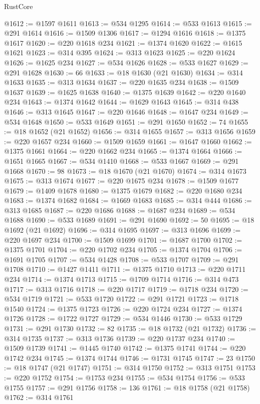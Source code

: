 \begin{lexlean}{RustCore}
\begin{coremodule}
@1612 := @1597 @1611
@1613 := @534 @1295
@1614 := @533 @1613
@1615 := @291 @1614
@1616 := @1509 @1306
@1617 := @1294 @1616
@1618 := @1375 @1617
@1620 := @220 @1618 @234
@1621 := @1374 @1620
@1622 := @1615 @1621
@1623 := @314 @395
@1624 := @313 @1623
@1625 := @220 @1624
@1626 := @1625 @234
@1627 := @534 @1626
@1628 := @533 @1627
@1629 := @291 @1628
@1630 := 66
@1633 := @18 @1630 (@21 @1630)
@1634 := @314 @1633
@1635 := @313 @1634
@1637 := @220 @1635 @234
@1638 := @1509 @1637
@1639 := @1625 @1638
@1640 := @1375 @1639
@1642 := @220 @1640 @234
@1643 := @1374 @1642
@1644 := @1629 @1643
@1645 := @314 @438
@1646 := @313 @1645
@1647 := @220 @1646
@1648 := @1647 @234
@1649 := @534 @1648
@1650 := @533 @1649
@1651 := @291 @1650
@1652 := 74
@1655 := @18 @1652 (@21 @1652)
@1656 := @314 @1655
@1657 := @313 @1656
@1659 := @220 @1657 @234
@1660 := @1509 @1659
@1661 := @1647 @1660
@1662 := @1375 @1661
@1664 := @220 @1662 @234
@1665 := @1374 @1664
@1666 := @1651 @1665
@1667 := @534 @1410
@1668 := @533 @1667
@1669 := @291 @1668
@1670 := 98
@1673 := @18 @1670 (@21 @1670)
@1674 := @314 @1673
@1675 := @313 @1674
@1677 := @220 @1675 @234
@1678 := @1509 @1677
@1679 := @1409 @1678
@1680 := @1375 @1679
@1682 := @220 @1680 @234
@1683 := @1374 @1682
@1684 := @1669 @1683
@1685 := @314 @444
@1686 := @313 @1685
@1687 := @220 @1686
@1688 := @1687 @234
@1689 := @534 @1688
@1690 := @533 @1689
@1691 := @291 @1690
@1692 := 50
@1695 := @18 @1692 (@21 @1692)
@1696 := @314 @1695
@1697 := @313 @1696
@1699 := @220 @1697 @234
@1700 := @1509 @1699
@1701 := @1687 @1700
@1702 := @1375 @1701
@1704 := @220 @1702 @234
@1705 := @1374 @1704
@1706 := @1691 @1705
@1707 := @534 @1428
@1708 := @533 @1707
@1709 := @291 @1708
@1710 := @1427 @1411
@1711 := @1375 @1710
@1713 := @220 @1711 @234
@1714 := @1374 @1713
@1715 := @1709 @1714
@1716 := @314 @473
@1717 := @313 @1716
@1718 := @220 @1717
@1719 := @1718 @234
@1720 := @534 @1719
@1721 := @533 @1720
@1722 := @291 @1721
@1723 := @1718 @1540
@1724 := @1375 @1723
@1726 := @220 @1724 @234
@1727 := @1374 @1726
@1728 := @1722 @1727
@1729 := @534 @1446
@1730 := @533 @1729
@1731 := @291 @1730
@1732 := 82
@1735 := @18 @1732 (@21 @1732)
@1736 := @314 @1735
@1737 := @313 @1736
@1739 := @220 @1737 @234
@1740 := @1509 @1739
@1741 := @1445 @1740
@1742 := @1375 @1741
@1744 := @220 @1742 @234
@1745 := @1374 @1744
@1746 := @1731 @1745
@1747 := 23
@1750 := @18 @1747 (@21 @1747)
@1751 := @314 @1750
@1752 := @313 @1751
@1753 := @220 @1752
@1754 := @1753 @234
@1755 := @534 @1754
@1756 := @533 @1755
@1757 := @291 @1756
@1758 := 136
@1761 := @18 @1758 (@21 @1758)
@1762 := @314 @1761

\end{coremodule}
\end{lexlean}
